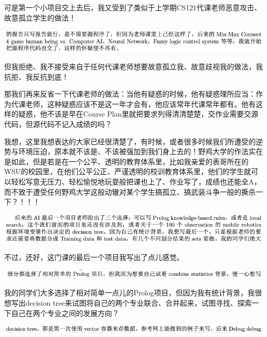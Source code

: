 \documentclass[9pt, b5paper]{article}
\begin{document}
可是第一个小项目交上去后，我又受到了类似于上学期CS121代课老师恶意攻击、故意孤立学生的做法！

\begin{center}
\includegraphics[width=.9\linewidth]{./pic/backups_plans_20210504_113458.png}
\end{center}

但我拒绝、我不接受来自于任何代课老师想要故意孤立我、故意歧视我的做法，我抗拒、我反抗到底！

那我们再来反省一下代课老师的做法：当他有疑惑的时候，他有疑惑理所应当：作为代课老师，这种疑惑应该不是这一年才会有，他应该常年代课常年都有。他有这样的疑惑，他不该是早在Course Plan里就把要求列得清清楚楚，交作业需要交源代码，但源代码不记入成绩的吗？

我想，这里我想表达的大家已经很清楚了，有时候，或者很多时候我们所遭受的逆势与环境压迫，原本就不该是、不该被强加到我们身上去的！野鸡大学的作法实在是如此，但是若是在一个公平、透明的教育体系里，比如我亲爱的表哥所在的WSU的校园里，在他们公平公正、严谨透明的校训教育体系里，他们的学生就可以轻松写意无压力、轻松愉悦地玩耍般把课也上了、作业写了，成绩也还能全A，而不致于遭受任何野鸡大学这般动辙对某个学生搞孤立、搞武装斗争一般的撕杀一下？！！！

\begin{center}
\includegraphics[width=.9\linewidth]{./pic/backups_plans_20210504_114719.png}
\end{center}

不过，还好，这门课的最后一个项目我写出了点儿感觉。 

\begin{center}
\includegraphics[width=.9\linewidth]{./pic/backups_plans_20210504_114917.png}
\end{center}

我的同学们大多选择了相对简单一点儿的Prolog项目，但因为我有统计背景，我很想写出decision tree来试图将自己的两个专业联合、合并起来，试图寻找、探索一下自己在两个专业之间的发展方向？

\begin{center}
\includegraphics[width=.9\linewidth]{./pic/backups_plans_20210504_115018.png}
\end{center}
\end{document}
